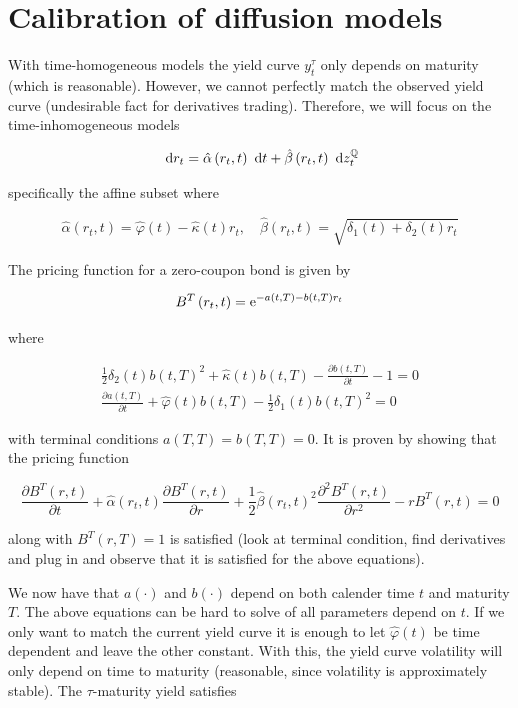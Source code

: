 \chapter{Calibration of diffusion models}
With time-homogeneous models the yield curve $y_{t}^{\tau}$ only depends on maturity (which is reasonable). However, we cannot perfectly match the observed yield curve (undesirable fact for derivatives trading). Therefore, we will focus on the time-inhomogeneous models

$$
\text{ d}  r_{t}=\hat{\alpha}\left(r_{t}, t\right) \text{ d}  t+\hat{\beta}\left(r_{t}, t\right) \text{ d}  z_{t}^{\mathbb{Q}}
$$

specifically the affine subset where

$$
\hat{\alpha}\left(r_{t}, t\right)=\hat{\varphi}(t)-\hat{\kappa}(t) r_{t}, \quad \hat{\beta}\left(r_{t}, t\right)=\sqrt{\delta_{1}(t)+\delta_{2}(t) r_{t}}
$$

The pricing function for a zero-coupon bond is given by

$$
B^{T}\left(r_{t}, t\right)=\mathrm{e}^{-a(t, T)-b(t, T) r_{t}}
$$

where

$$
\begin{array}{r}
\frac{1}{2} \delta_{2}(t) b(t, T)^{2}+\hat{\kappa}(t) b(t, T)-\frac{\partial b(t, T)}{\partial t}-1=0 \\
\frac{\partial a(t, T)}{\partial t}+\hat{\varphi}(t) b(t, T)-\frac{1}{2} \delta_{1}(t) b(t, T)^{2}=0
\end{array}
$$

with terminal conditions $a(T, T)=b(T, T)=0$. It is proven by showing that the pricing function

$$
\frac{\partial B^{T}(r, t)}{\partial t}+\hat{\alpha}\left(r_{t}, t\right) \frac{\partial B^{T}(r, t)}{\partial r}+\frac{1}{2} \hat{\beta}\left(r_{t}, t\right)^{2} \frac{\partial^{2} B^{T}(r, t)}{\partial r^{2}}-r B^{T}(r, t)=0
$$

along with $B^{T}(r, T)=1$ is satisfied (look at terminal condition, find derivatives and plug in and observe that it is satisfied for the above equations).

We now have that $a(\cdot)$ and $b(\cdot)$ depend on both calender time $t$ and maturity $T$. The above equations can be hard to solve of all parameters depend on $t$. If we only want to match the current yield curve it is enough to let $\hat{\varphi}(t)$ be time dependent and leave the other constant. With this, the yield curve volatility will only depend on time to maturity (reasonable, since volatility is approximately stable). The $\tau$-maturity yield satisfies

